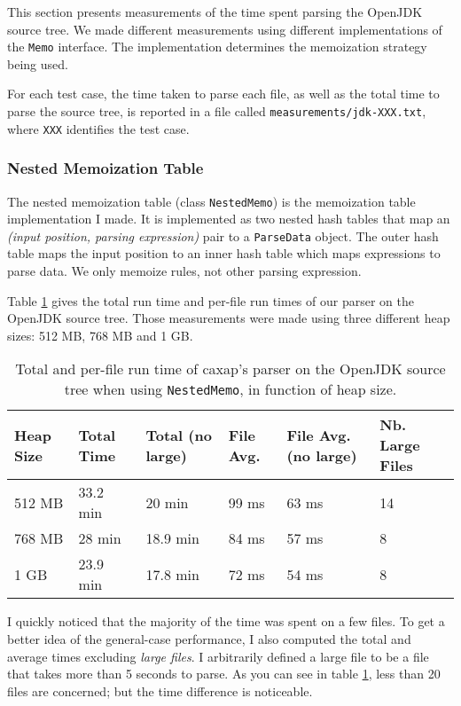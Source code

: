 This section presents measurements of the time spent parsing the OpenJDK source
tree. We made different measurements using different implementations of the
\texttt{Memo} interface. The implementation determines the memoization strategy
being used.

For each test case, the time taken to parse each file, as well as the total time
to parse the source tree, is reported in a file called
\texttt{measurements/jdk-XXX.txt}, where \texttt{XXX} identifies the test case.

\subsubsection{Nested Memoization Table}

The nested memoization table (class \texttt{NestedMemo}) is the memoization
table implementation I made. It is implemented as two nested hash tables that
map an \emph{(input position, parsing expression)} pair to a \texttt{ParseData}
object. The outer hash table maps the input position to an inner hash table
which maps expressions to parse data. We only memoize rules, not other parsing
expression.

Table \ref{measurements1} gives the total run time and per-file run times of our
parser on the OpenJDK source tree. Those measurements were made using three
different heap sizes: 512 MB, 768 MB and 1 GB.

\begin{table}[here]
\begin{tabular}{|l|l|l|l|l|l|}
\hline
Heap Size & Total Time & Total (no large) & File Avg. &
File Avg. (no large) & Nb. Large Files\\
\hline
\hline
512 MB & 33.2 min & 20 min   & 99 ms & 63 ms & 14 \\ \hline
768 MB & 28 min   & 18.9 min & 84 ms & 57 ms & 8  \\ \hline
1 GB   & 23.9 min & 17.8 min & 72 ms & 54 ms & 8  \\ \hline
\end{tabular}
\caption{Total and per-file run time of caxap's parser on the OpenJDK source
  tree when using \texttt{NestedMemo}, in function of heap size.}
\label{measurements1}
\end{table}

I quickly noticed that the majority of the time was spent on a few files. To get
a better idea of the general-case performance, I also computed the total and
average times excluding \emph{large files}. I arbitrarily defined a large file
to be a file that takes more than 5 seconds to parse. As you can see in table
\ref{measurements1}, less than 20 files are concerned; but the time difference
is noticeable.

